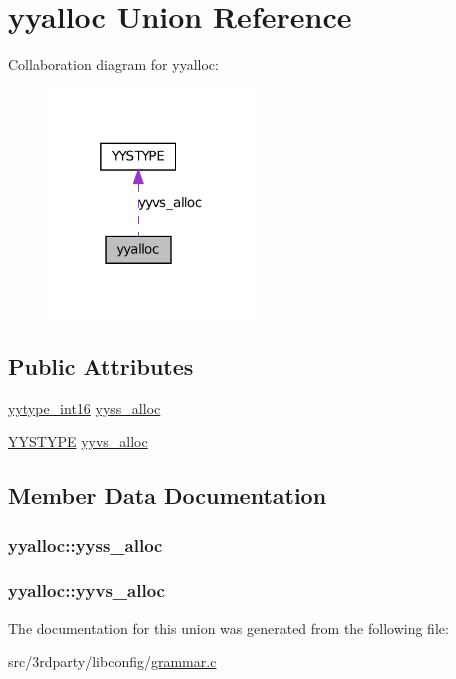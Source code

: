 \hypertarget{unionyyalloc}{
\section{yyalloc Union Reference}
\label{unionyyalloc}
}


Collaboration diagram for yyalloc:
\nopagebreak
\begin{figure}[H]
\begin{center}
\leavevmode
\includegraphics[width=157pt]{unionyyalloc__coll__graph}
\end{center}
\end{figure}
\subsection*{Public Attributes}
\begin{DoxyCompactItemize}
\item 
\hyperlink{grammar_8c_ade5b97f0021a4f6c5922ead3744ab297}{yytype\_\-int16} \hyperlink{unionyyalloc_a4800e0520a89a4789afa7b5d82197e65}{yyss\_\-alloc}
\item 
\hyperlink{union_y_y_s_t_y_p_e}{YYSTYPE} \hyperlink{unionyyalloc_a9326f4fdc6f737a929444427836d8928}{yyvs\_\-alloc}
\end{DoxyCompactItemize}


\subsection{Member Data Documentation}
\hypertarget{unionyyalloc_a4800e0520a89a4789afa7b5d82197e65}{
\subsubsection[{yyss\_\-alloc}]{ {\bf yyalloc::yyss\_\-alloc}}}
\label{unionyyalloc_a4800e0520a89a4789afa7b5d82197e65}
\hypertarget{unionyyalloc_a9326f4fdc6f737a929444427836d8928}{
\subsubsection[{yyvs\_\-alloc}]{ {\bf yyalloc::yyvs\_\-alloc}}}
\label{unionyyalloc_a9326f4fdc6f737a929444427836d8928}


The documentation for this union was generated from the following file:\begin{DoxyCompactItemize}
\item 
src/3rdparty/libconfig/\hyperlink{grammar_8c}{grammar.c}\end{DoxyCompactItemize}
